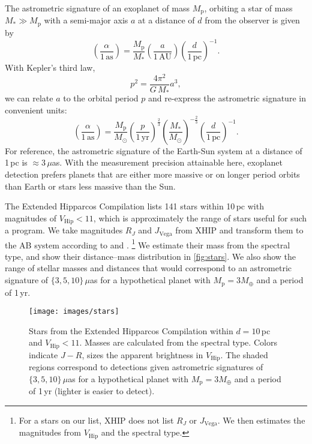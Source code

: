 \documentclass[modern, times]{aastex61}
\begin{document}
The astrometric signature of an exoplanet of mass $M_\mathrm{p}$, orbiting a star of mass $M_*\gg M_\mathrm{p}$ with a semi-major axis $a$ at a distance of $d$ from the observer is given by
\begin{equation}
\left(\frac{\alpha}{1\,\mathrm{as}}\right) = \frac{M_\mathrm{p}}{M_*} \left(\frac{a}{1\,\mathrm{AU}}\right) \left(\frac{d}{1\,\mathrm{pc}}\right)^{-1}.
\end{equation}
With Kepler's third law,
\begin{equation}
p^2 = \frac{4\pi^2}{G\,M_*} a^3,
\end{equation}
we can relate $a$ to the orbital period $p$ and re-express the astrometric signature in convenient units:
\begin{equation}
\left(\frac{\alpha}{1\,\mathrm{as}}\right) = \frac{M_\mathrm{p}}{M_\odot} \left(\frac{p}{1\,\mathrm{yr}}\right)^\frac{2}{3}\left(\frac{M_*}{M_\odot}\right)^{-\frac{2}{3}}\left(\frac{d}{1\,\mathrm{pc}}\right)^{-1}.
\end{equation}
For reference, the astrometric signature of the Earth-Sun system at a distance of 1\,pc is $\approx3\,\mu$as.
With the measurement precision attainable here, exoplanet detection prefers planets that are either more massive or on longer period orbits than Earth or stars less massive than the Sun.

The Extended Hipparcos Compilation \citep[XHIP]{Anderson2012} lists 141 stars within 10\,pc with magnitudes of $V_\mathrm{Hip} < 11$, which is approximately the range of stars useful for such a program. 
We take magnitudes $R_J$ and $J_\mathrm{Vega}$ from XHIP and transform them to the AB system according to \citet{Frei1994} and \citep{Blanton2005}.%
\footnote{For a stars on our list, XHIP does not list $R_J$ or $J_\mathrm{Vega}$. We then estimates the magnitudes from $V_\mathrm{Hip}$ and the spectral type.}
We estimate their mass from the spectral type, and show their distance--mass distribution in \autoref{fig:stars}.
We also show the range of stellar masses and distances that would correspond to an astrometric signature of $\lbrace3,5,10\rbrace\,\mu$as for a hypothetical planet with $M_\mathrm{p} = 3M_\oplus$ and a period of 1\,yr.

\begin{figure}[t]
\centering\texttt{[image: images/stars]}
\caption{Stars from the Extended Hipparcos Compilation within $d=10\,$pc and $V_\mathrm{Hip} < 11$. 
Masses are calculated from the spectral type. 
Colors indicate $J-R$, sizes the apparent brightness in $V_\mathrm{Hip}$. 
The shaded regions correspond to detections given astrometric signatures of $\lbrace3,5,10\rbrace\,\mu$as for a hypothetical planet with $M_\mathrm{p} = 3M_\oplus$ and a period of 1\,yr (lighter is easier to detect).
}
\label{fig:stars}
\end{figure}
\end{document}
